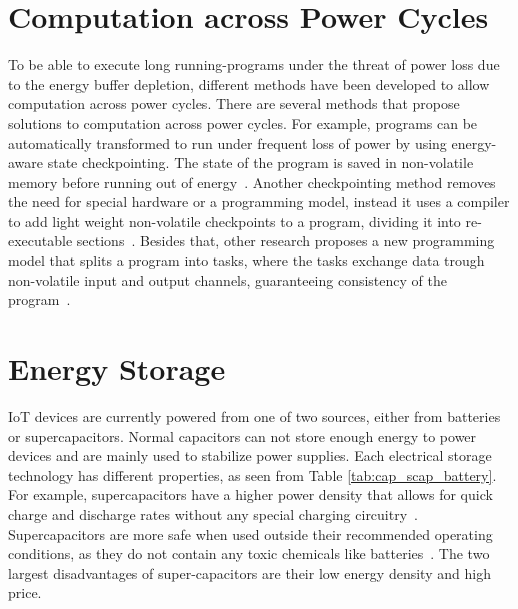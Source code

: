 \section{Computation across Power Cycles}
\label{sec:rw_comp_pc} 

To be able to execute long running-programs under the threat of power loss due to the energy buffer depletion, different methods have been developed to allow computation across power cycles.
There are several methods that propose solutions to computation across power cycles.
For example, programs can be automatically transformed to run under frequent loss of power by using energy-aware state checkpointing.
The state of the program is saved in non-volatile memory before running out of energy~\cite{ransford_asplos_2011}.
Another checkpointing method removes the need for special hardware or a programming model, instead it uses a compiler to add light weight non-volatile checkpoints to a program, dividing it into re-executable sections~\cite{vanderwoude_osdi_2016}.
Besides that, other research proposes a new programming model that splits a program into tasks, where the tasks exchange data trough non-volatile input and output channels, guaranteeing consistency of the program~\cite{colin_oopsla_2017}.


\section{Energy Storage}
\label{sec:rw_energy_storage}




IoT devices are currently powered from one of two sources, either from batteries or supercapacitors.
Normal capacitors can not store enough energy to power devices and are mainly used to stabilize power supplies.
Each electrical storage technology has different properties, as seen from Table \ref{tab:cap_scap_battery}.
For example, supercapacitors have a higher power density that allows for quick charge and discharge rates without any special charging circuitry~\cite{prasad_comst_2014}.
Supercapacitors are more safe when used outside their recommended operating conditions, as they do not contain any toxic chemicals like batteries~\cite{maxwell_overview_2017}.
The two largest disadvantages of super-capacitors are their low energy density and high price.

